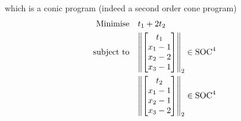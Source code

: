 \begin{enumerate}
\begin{enumerate}[label=(\arabic*)]
                    which is a conic program (indeed a second order cone program)
                    \begin{align*}
                        \text{Minimise} \quad   & t_1 + 2t_2                                      \\
                        \text{subject to} \quad & \norm{\begin{bmatrix} t_1 \\ x_1 - 1 \\ x_2 - 2 \\ x_3 - 1\end{bmatrix}}_2 \in \operatorname{SOC}^4 \\
                                                & \norm{\begin{bmatrix} t_2 \\ x_1 - 1 \\ x_2 - 1 \\ x_3 - 2\end{bmatrix}}_2 \in \operatorname{SOC}^4
                    \end{align*}
          \end{enumerate}


\end{enumerate}
